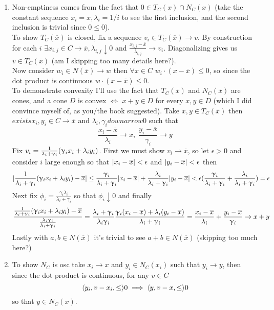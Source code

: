 \documentclass{article}
\newenvironment{ex}[1]
  {\renewcommand\theexercise{#1}\exercise}
  {\endexercise}
\begin{document}
\begin{ex}{7.10} %
  \begin{enumerate}[label=(\alph*)]
    \newcommand{\xb}{\overline{x}}
    \item
      Non-emptiness comes from the fact that $0 \in T_C(x) \cap N_C(x)$ (take the constant sequence $x_i = x, \lambda_i = 1/i$ to see the first inclusion, and the second inclusion is trivial since $0 \le 0$). \, \\
      To show $T_C(\xb)$ is closed, fix a sequence $v_i \in T_C(\xb) \to v$. By construction for each $i$ $\exists x_{i,j} \in C \to \xb, \lambda_{i, j} \downarrow 0$ and $\frac{x_{i,j} - \xb}{\lambda_{i,j}} \to v_i$. Diagonalizing gives us $v \in T_C(\xb)$ (am I skipping too many details here?). \, \\

      Now consider $w_i \in N(\xb) \to w$ then $\forall x \in C$ $w_i \cdot (x - \xb) \le 0$, so since the dot product is continuous $w \cdot (x - \xb) \le 0$. \, \\

      To demonstrate convexity I'll use the fact that $T_C(\xb)$ and $N_C(\xb)$ are cones, and a cone $D$ is convex $\iff$ $x + y \in D$ for every $x, y \in D$ (which I did convince myself of, as you/the book suggested). Take $x, y \in T_C(\xb)$ then $exists x_i, y_i \in C \to \xb$ and $\lambda_i, \gamma_i downarrow 0$ such that
      $$
      \frac{x_i - \xb}{\lambda_i} \to x, \; \frac{y_i - \xb}{\gamma_i} \to y
      $$
      Fix $v_i = \frac{1}{\lambda_i + \gamma_i}\parens{\gamma_i x_i + \lambda_i y_i}$. First we must show $v_i \to \xb$, so let $\epsilon > 0$ and consider $i$ large enough so that $\abs{x_i - \xb} < \epsilon$ and $\abs{y_i - \xb} < \epsilon$ then
      $$
      \abs{\frac{1}{\lambda_i + \gamma_i}\parens{\gamma_i x_i + \lambda_i y_i} - \xb} \le \frac{\gamma_i}{\lambda_i + \gamma_i} \abs{x_i - \xb} + \frac{\lambda_i}{\lambda_i + \gamma_i} \abs{y_i - \xb} < \epsilon \parens{\frac{\gamma_i}{\lambda_i + \gamma_i} + \frac{\lambda_i}{\lambda_i + \gamma_i}} = \epsilon
      $$
      Next fix $\phi_i = \frac{\gamma_i \lambda_i}{\lambda_i + \gamma_i}$ so that $\phi_i \downarrow 0$ and finally
      $$
      \frac{\frac{1}{\lambda_i + \gamma_i}\parens{\gamma_i x_i + \lambda_i y_i} - \xb}{\frac{\lambda_i \gamma_i}{\lambda_i + \gamma_i}} = \frac{\lambda_i+\gamma_i}{\lambda_i \gamma_i} \frac{\gamma_i\parens{x_i - \xb} + \lambda_i \parens{y_i - \xb}}{\lambda_i+\gamma_i} = \frac{x_i - \xb}{\lambda_i} + \frac{y_i - \xb}{\gamma_i} \to x + y
      $$
      Lastly with $a, b \in N(\xb)$ it's trivial to see $a + b \in N(\xb)$ (skipping too much here?)
    \item
      To show $N_C$ is osc take $x_i \to x$ and $y_i \in N_C(x_i)$ such that $y_i \to y$, then since the dot product is continuous, for any $v \in C$
      $$
      \langle y_i, v - x_i, \le\rangle 0 \implies \langle y, v - x, \le\rangle 0
      $$
      so that $y \in N_C(x)$.
  \end{enumerate}
\end{ex} %
\end{document}
